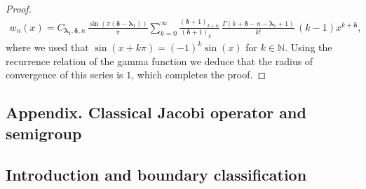 \documentclass[JEP,XML,SOM,Unicode]{cedram}
\theoremstyle{plain}
\theoremstyle{definition}
\newcommand{\N}{\mathbb{N}}
\newcommand{\lam}{{\bm{\lambda}_1}}
\newcommand{\mm}{{\bm{\delta}}}
\begin{document}
\begin{proof}
\begin{align*}
w_n(x) = C_{\lam, \mm, n}\, \frac{\sin(\pi(\mm-\lam))}{\pi} \sum_{k = 0}^{\infty} \frac{(\mm+1)_{k+n}}{(\mm+1)_{k\phantom{+n}}}\, \frac{\Gamma(k+\mm-n-\lam+1)}{k!}\,(k-1) x^{k+\mm},
\end{align*}
where we used that $\sin(x+k\pi) = (-1)^k\sin(x)$ for $k \in \N$. Using the recurrence relation of the gamma function we deduce that the radius of convergence of this series is $1$, which completes the proof.
\end{proof}

\begin{appendix}
\section*{Appendix. Classical Jacobi operator and semigroup}
\label{sec:classical-Jacobi}

\subsection{Introduction and boundary classification}


\end{appendix}
\end{document}
